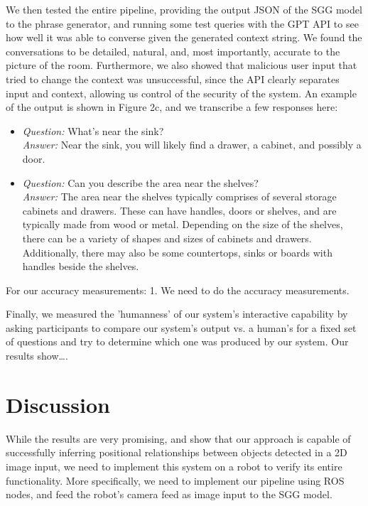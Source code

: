 \documentclass[letterpaper, 10 pt, conference]{ieeeconf}  %
\begin{document}
\begin{figure}
    \end{figure}

    We then tested the entire pipeline, providing the output JSON of the SGG model to the phrase generator, and running some test queries with the GPT API to see how well it was able to converse given the generated context string. We found the conversations to be detailed, natural, and, most importantly, accurate to the picture of the room. Furthermore, we also showed that malicious user input that tried to change the context was unsuccessful, since the API clearly separates input and context, allowing us control of the security of the system. An example of the output is shown in Figure 2c, and we transcribe a few responses here:
    \begin{itemize}
        \item \textit{Question:} What's near the sink? \\ \textit{Answer:} Near the sink, you will likely find a drawer, a cabinet, and possibly a door.
        \item \textit{Question:} Can you describe the area near the shelves? \\ \textit{Answer:} The area near the shelves typically comprises of several storage cabinets and drawers. These can have handles, doors or shelves, and are typically made from wood or metal. Depending on the size of the shelves, there can be a variety of shapes and sizes of cabinets and drawers. Additionally, there may also be some countertops, sinks or boards with handles beside the shelves.
    \end{itemize}

    For our accuracy measurements:
    1. We need to do the accuracy measurements.

    Finally, we measured the 'humanness' of our system's interactive capability by asking participants to compare our system's output vs. a human's for a fixed set of questions and try to determine which one was produced by our system. Our results show\dots.

\section{Discussion}
    While the results are very promising, and show that our approach is capable of successfully inferring positional relationships between objects detected in a 2D image input, we need to implement this system on a robot to verify its entire functionality. More specifically, we need to implement our pipeline using ROS nodes, and feed the robot's camera feed as image input to the SGG model.
\end{document}
